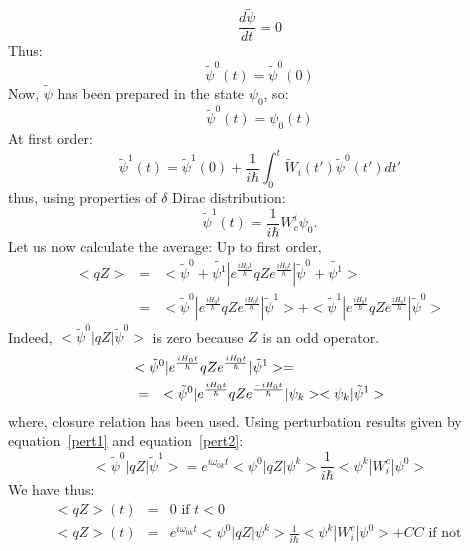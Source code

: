 \documentclass[12pt]{book}
\begin{document}
\begin{equation}
 \frac{d\tilde{\psi}}{dt}=0
\end{equation}
Thus:
\begin{equation}
\tilde{\psi}^0(t)=\tilde{\psi}^0(0)
\end{equation}
Now, $\tilde{\psi}$ has been prepared in the state $\psi_0$, so:
\begin{equation}
\tilde{\psi}^0(t)=\psi_0(t)
\label{pert1}
\end{equation}
At first order:
\begin{equation}
\tilde{\psi}^1(t)=\tilde{\psi}^1(0)+\frac{1}{i\hbar}\int_0^t\tilde{W}_i(t\prime)\tilde{\psi}^0(t\prime)dt\prime
\end{equation}
thus, using properties of $\delta$ Dirac distribution:
\begin{equation}
\tilde{\psi}^1(t)=\frac{1}{i\hbar}W^i_c\psi_0.
\label{pert2}
\end{equation}
Let us now calculate the average:
Up to first order,
\begin{eqnarray}
 \mathrel{<} qZ\mathrel{>} &=& \mathrel{<}
\tilde{\psi}^0+\tilde{\psi^1}|e^{\frac{iH_0t}{\hbar}}
qZe^{\frac{iH_0t}{\hbar}}|\tilde{\psi}^0+\tilde{\psi^1}\mathrel{>} 
\\ 
&=& \mathrel{<} \tilde{\psi}^0|
e^{\frac{iH_0t}{\hbar}}qZe^{\frac{iH_0t}{\hbar}}|\tilde{\psi}^1\mathrel{>}
+ \mathrel{<}
\tilde{\psi}^1|e^{\frac{iH_0t}{\hbar}}
qZe^{\frac{iH_0t}{\hbar}}|\tilde{\psi}^0\mathrel{>} 
\end{eqnarray}
Indeed, $ \mathrel{<} \tilde{\psi}^0|qZ|\tilde{\psi}^0\mathrel{>} $ is zero
because $Z$ is an odd operator.
\begin{eqnarray}
\lefteqn{ \mathrel{<}
\tilde{\psi}^0|e^{\frac{iH_0t}{\hbar}}qZ
e^{\frac{iH_0t}{\hbar}}|\tilde{\psi}^1\mathrel{>} 
=}\\ 
&=& \mathrel{<} {\tilde{\psi}}^0|
e^{\frac{iH_0t}{\hbar}}qZe^{\frac{-iH_0t}{\hbar}}|{\psi}_k\mathrel{>}
\mathrel{<} {\psi}_k|{\tilde{\psi}}^1\mathrel{>}  
\end{eqnarray}
where, closure relation has been used. Using perturbation results given by
equation~\ref{pert1} and equation~\ref{pert2}:
\begin{equation}
 \mathrel{<} \tilde{\psi}^0|qZ|\tilde{\psi}^1\mathrel{>} =e^{i\omega_{0k}t} \mathrel{<} {\psi}^0|qZ|{\psi}^k\mathrel{>} \frac{1}{i\hbar} \mathrel{<} {\psi}^k|W^c_i|{\psi}^0\mathrel{>} 
\end{equation}
We have thus:
\begin{eqnarray}
 \mathrel{<} qZ\mathrel{>} (t)&=& 0 \mbox{ if } t < 0\\
 \mathrel{<} qZ\mathrel{>} (t)&=&
e^{i\omega_{0k}t} \mathrel{<} {\psi}^0|qZ|{\psi}^k\mathrel{>} \frac{1}{i\hbar} \mathrel{<} {\psi}^k|W^c_i|{\psi}^0\mathrel{>} +CC
\mbox{ if not }
\end{eqnarray}
\end{document}
